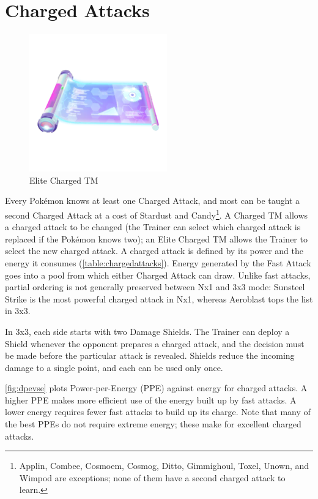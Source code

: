 \section{Charged Attacks}
\label{sec:charged}
\begin{figure}
  \center
  \includegraphics[width=.25\textwidth]{images/elitechargedtm.png}
  \caption*{Elite Charged TM}
\end{figure}
Every Pokémon knows at least one Charged Attack, and most can be taught a second
  Charged Attack at a cost of Stardust and Candy\footnote{Applin, Combee,
  Cosmoem, Cosmog, Ditto, Gimmighoul, Toxel, Unown, and Wimpod are exceptions;
  none of them have a second charged attack to learn.}.
A Charged TM allows a charged attack to be changed (the Trainer can select
  which charged attack is replaced if the Pokémon knows two);
  an Elite Charged TM allows the Trainer to select the new charged attack.
A charged attack is defined by its power and the energy it consumes (\autoref{table:chargedattacks}).
Energy generated by the Fast Attack goes into a pool from which either Charged Attack can draw.
Unlike fast attacks, partial ordering is not generally preserved between Nx1 and 3x3 mode:
  Sunsteel Strike is the most powerful charged attack in Nx1, whereas Aeroblast tops
  the list in 3x3.


In 3x3, each side starts with two Damage Shields.
The Trainer can deploy a Shield whenever the opponent prepares a charged attack,
   and the decision must be made before the particular attack is revealed.
Shields reduce the incoming damage to a single point, and each can be used only once.

\autoref{fig:dpevse} plots Power-per-Energy (PPE) against energy for charged attacks.
A higher PPE makes more efficient use of the energy built up by fast attacks.
A lower energy requires fewer fast attacks to build up its charge.
Note that many of the best PPEs do not require extreme energy; these make
 for excellent charged attacks.

